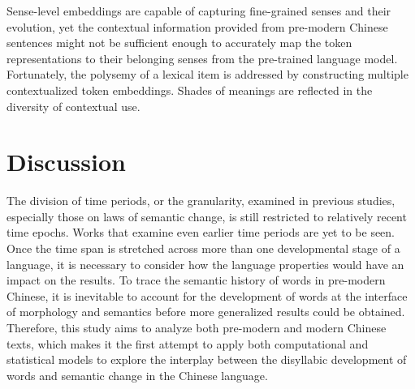 \begin{exe}
\end{exe}

Sense-level embeddings are capable of capturing fine-grained senses and their evolution, yet the contextual information provided from pre-modern Chinese sentences might not be sufficient enough to accurately map the token representations to their belonging senses from the pre-trained language model. Fortunately, the polysemy of a lexical item is addressed by constructing multiple contextualized token embeddings. Shades of meanings are reflected in the diversity of contextual use.




\section{Discussion}
The division of time periods, or the granularity, examined in previous studies, especially those on laws of semantic change, is still restricted to relatively recent time epochs. Works that examine even earlier time periods are yet to be seen. Once the time span is stretched across more than one developmental stage of a language, it is necessary to consider how the language properties would have an impact on the results. To trace the semantic history of words in pre-modern Chinese, it is inevitable to account for the development of words at the interface of morphology and semantics before more generalized results could be obtained. Therefore, this study aims to analyze both pre-modern and modern Chinese texts, which makes it the first attempt to apply both computational and statistical models to explore the interplay between the disyllabic development of words and semantic change in the Chinese language.

